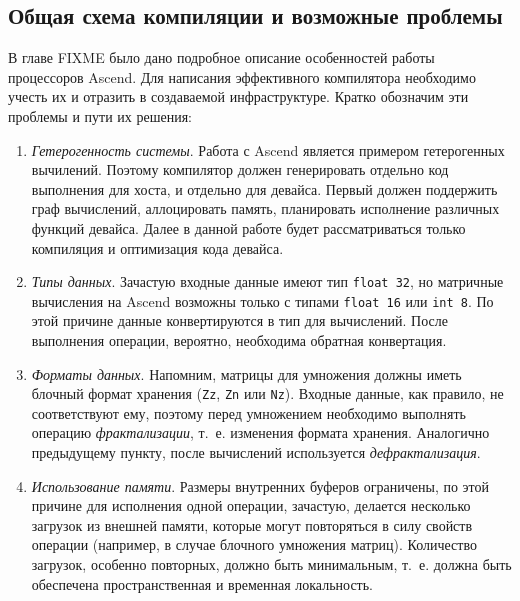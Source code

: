 \subsection{Общая схема компиляции и возможные проблемы}
\label{impl:problem}

В главе FIXME было дано подробное описание особенностей работы процессоров Ascend.
Для написания эффективного компилятора необходимо учесть их и отразить
в создаваемой инфраструктуре. Кратко обозначим эти проблемы и пути их решения:

\begin{enumerate}
    \item \textit{Гетерогенность системы}. Работа с Ascend является примером
          гетерогенных вычилений. Поэтому компилятор должен генерировать
          отдельно код выполнения для хоста, и отдельно для девайса. Первый
          должен поддержить граф вычислений, аллоцировать память, планировать
          исполнение различных функций девайса. Далее в данной работе будет
          рассматриваться только компиляция и оптимизация кода девайса.
    
    \item \textit{Типы данных}. Зачастую входные данные имеют тип \texttt{float 32},
          но матричные вычисления на Ascend возможны только с типами
          \texttt{float 16} или \texttt{int 8}. По этой причине данные
          конвертируются в тип для вычислений. После выполнения операции,
          вероятно, необходима обратная конвертация.

    \item \textit{Форматы данных}. Напомним, матрицы для умножения должны иметь
          блочный формат хранения (\texttt{Zz}, \texttt{Zn} или \texttt{Nz}).
          Входные данные, как правило, не соответствуют ему, поэтому перед
          умножением необходимо выполнять операцию \textit{фрактализации}, т.~е.
          изменения формата хранения. Аналогично предыдущему пункту, после
          вычислений используется \textit{дефрактализация}.

    \item \textit{Использование памяти}. Размеры внутренних буферов ограничены,
          по этой причине для исполнения одной операции, зачастую, делается
          несколько загрузок из внешней памяти, которые могут повторяться в
          силу свойств операции (например, в случае блочного умножения матриц).
          Количество загрузок, особенно повторных, должно быть минимальным,
          т.~е. должна быть обеспечена пространственная и временная локальность.


\end{enumerate}
